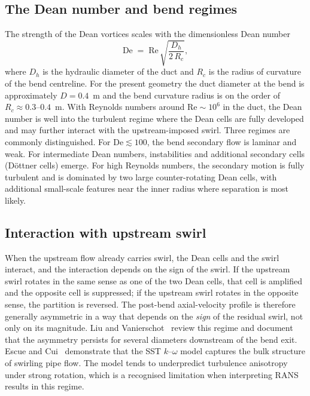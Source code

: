 \subsection{The Dean number and bend regimes}
\label{sec:theory_dean_number}
 
The strength of the Dean vortices scales with the dimensionless Dean number
\begin{equation}
\mathrm{De} \;=\; \mathrm{Re}\,\sqrt{\frac{D_h}{2\,R_c}},
\label{eq:dean}
\end{equation}
where $D_h$ is the hydraulic diameter of the duct and $R_c$ is the radius of curvature of the bend centreline. For the present geometry the duct diameter at the bend is approximately $D = 0.4$~m and the bend curvature radius is on the order of $R_c \approx 0.3$--$0.4$~m. With Reynolds numbers around $\mathrm{Re} \sim 10^6$ in the duct, the Dean number is well into the turbulent regime where the Dean cells are fully developed and may further interact with the upstream-imposed swirl. Three regimes are commonly distinguished. For $\mathrm{De} \lesssim 100$, the bend secondary flow is laminar and weak. For intermediate Dean numbers, instabilities and additional secondary cells (D\"ottner cells) emerge. For high Reynolds numbers, the secondary motion is fully turbulent and is dominated by two large counter-rotating Dean cells, with additional small-scale features near the inner radius where separation is most likely.
 
\subsection{Interaction with upstream swirl}
\label{sec:theory_swirl_bend_interaction}
 
When the upstream flow already carries swirl, the Dean cells and the swirl interact, and the interaction depends on the sign of the swirl. If the upstream swirl rotates in the same sense as one of the two Dean cells, that cell is amplified and the opposite cell is suppressed; if the upstream swirl rotates in the opposite sense, the partition is reversed. The post-bend axial-velocity profile is therefore generally asymmetric in a way that depends on the \emph{sign} of the residual swirl, not only on its magnitude. Liu and Vanierschot~\cite{LiuVanierschot2021} review this regime and document that the asymmetry persists for several diameters downstream of the bend exit. Escue and Cui~\cite{EscueCui2010} demonstrate that the SST $k$--$\omega$ model captures the bulk structure of swirling pipe flow. The model tends to underpredict turbulence anisotropy under strong rotation, which is a recognised limitation when interpreting RANS results in this regime.
 
